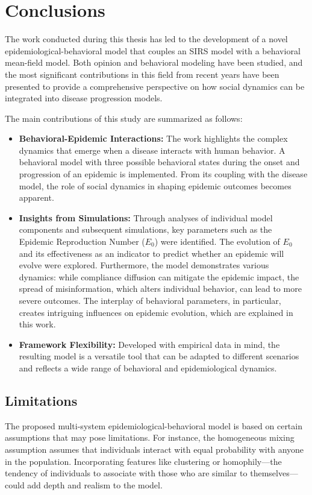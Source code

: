 \chapter{Conclusions}

The work conducted during this thesis has led to the development of a novel epidemiological-behavioral model that couples an SIRS model with a behavioral mean-field model. Both opinion and behavioral modeling have been studied, and the most significant contributions in this field from recent years have been presented to provide a comprehensive perspective on how social dynamics can be integrated into disease progression models.

The main contributions of this study are summarized as follows:
\begin{itemize}
	
\item \textbf{Behavioral-Epidemic Interactions:} The work highlights the complex dynamics that emerge when a disease interacts with human behavior. A behavioral model with three possible behavioral states during the onset and progression of an epidemic is implemented. From its coupling with the disease model, the role of social dynamics in shaping epidemic outcomes becomes apparent.

\item \textbf{Insights from Simulations:} Through analyses of individual model components and subsequent simulations, key parameters such as the Epidemic Reproduction Number ($E_0$) were identified. The evolution of $E_0$ and its effectiveness as an indicator to predict whether an epidemic will evolve were explored. Furthermore, the model demonstrates various dynamics: while compliance diffusion can mitigate the epidemic impact, the spread of misinformation, which alters individual behavior, can lead to more severe outcomes. The interplay of behavioral parameters, in particular, creates intriguing influences on epidemic evolution, which are explained in this work.

\item \textbf{Framework Flexibility:} Developed with empirical data in mind, the resulting model is a versatile tool that can be adapted to different scenarios and reflects a wide range of behavioral and epidemiological dynamics.
\end{itemize}

\section{Limitations}
The proposed multi-system epidemiological-behavioral model is based on certain assumptions that may pose limitations. For instance, the homogeneous mixing assumption assumes that individuals interact with equal probability with anyone in the population. Incorporating features like clustering or homophily—the tendency of individuals to associate with those who are similar to themselves—could add depth and realism to the model.

